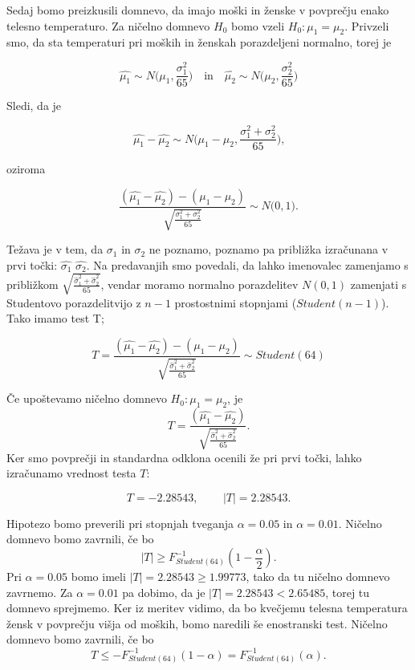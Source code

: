 \documentclass[12pt, a4paper]{article}
\begin{document}
Sedaj bomo preizkusili domnevo, da imajo moški in ženske v povprečju enako
telesno temperaturo. Za ničelno domnevo $H_0$ bomo vzeli $H_0 : \mu_1 = \mu_2$.
Privzeli smo, da sta temperaturi pri moških in ženskah porazdeljeni normalno, 
torej je 

$$\hat{\mu_1} \sim N\Big(\mu_1, \frac{\sigma_1^2}{65}\Big) \quad \text{in} 
\quad \hat{\mu_2} \sim N\Big(\mu_2, \frac{\sigma_2^2}{65}\Big)$$

Sledi, da je 

$$\hat{\mu_1} - \hat{\mu_2} \sim N\Big(\mu_1 - \mu_2, \frac{\sigma_1^2 + 
\sigma_2^2}{65}\Big) \text{,}
$$

oziroma

$$ \frac{(\hat{\mu_1} - \hat{\mu_2}) - (\mu_1 - \mu_2)}
{\sqrt{\frac{\sigma_1^2 + \sigma_2^2}{65}}}
\sim N\big(0, 1\big) \text{.}
$$ 

Težava je v tem, da $\sigma_1$ in $\sigma_2$ ne poznamo, poznamo pa približka
izračunana v prvi točki: $\hat{\sigma_1}$ $\hat{\sigma_2}$. Na predavanjih
smo povedali, da lahko imenovalec
zamenjamo s približkom ${\sqrt{\frac{\hat{\sigma}_1^2 + \hat{\sigma}_2^2}{65}}} $, 
vendar moramo normalno porazdelitev $N(0,1)$ zamenjati s Studentovo porazdelitvijo
z $n-1$ prostostnimi stopnjami ($Student(n-1)$). Tako imamo test T;

$$T = \frac{(\hat{\mu_1} - \hat{\mu_2}) - (\mu_1 - \mu_2)}
{\sqrt{\frac{\hat{\sigma}_1^2 + \hat{\sigma}_2^2}{65}}}
\sim Student(64)
$$ 

Če upoštevamo ničelno domnevo $H_0 : \mu_1 = \mu_2$, je 
$$T = \frac{(\hat{\mu_1} - \hat{\mu_2})} {\sqrt{\frac{\hat{\sigma}_1^2 + 
\hat{\sigma}_2^2}{65}}}\text{.}
$$
Ker 
smo povprečji in standardna odklona ocenili že pri prvi točki, lahko izračunamo
vrednost testa $T$:

$$T = -2.28543 \text{, } \qquad |T| = 2.28543 \text{.}
$$

Hipotezo bomo preverili pri stopnjah tveganja $\alpha = 0.05$ in $\alpha = 0.01$.
Ničelno domnevo bomo zavrnili, če bo 
$$|T| \geq F^{-1}_{Student(64)}(1-\frac{\alpha}{2}) \text{.}
$$ 
Pri $\alpha = 0.05$ bomo imeli $|T| = 2.28543 \geq 1.99773$, tako da tu ničelno
domnevo zavrnemo. Za $\alpha = 0.01$ pa dobimo, da je $|T| = 2.28543 < 2.65485$,
torej tu domnevo sprejmemo.
Ker iz meritev vidimo, da bo kvečjemu telesna temperatura žensk v povprečju 
višja od moških, bomo naredili še enostranski test. Ničelno domnevo bomo zavrnili, 
če bo 
$$T \leq - F^{-1}_{Student(64)}(1-\alpha) = F^{-1}_{Student(64)}(\alpha) \text{.}
$$
\end{document}
